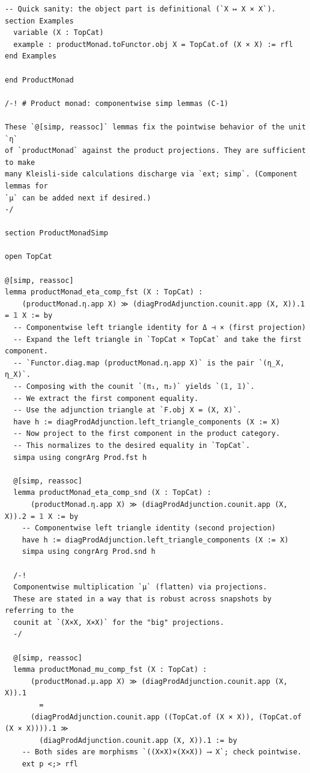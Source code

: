 \documentclass[12pt]{article}
\begin{document}
\begin{lstlisting}
-- Quick sanity: the object part is definitional (`X ↦ X × X`).
section Examples
  variable (X : TopCat)
  example : productMonad.toFunctor.obj X = TopCat.of (X × X) := rfl
end Examples

end ProductMonad

/-! # Product monad: componentwise simp lemmas (C‑1)

These `@[simp, reassoc]` lemmas fix the pointwise behavior of the unit `η`
of `productMonad` against the product projections. They are sufficient to make
many Kleisli-side calculations discharge via `ext; simp`. (Component lemmas for
`μ` can be added next if desired.)
-/

section ProductMonadSimp

open TopCat

@[simp, reassoc]
lemma productMonad_eta_comp_fst (X : TopCat) :
    (productMonad.η.app X) ≫ (diagProdAdjunction.counit.app (X, X)).1 = 𝟙 X := by
  -- Componentwise left triangle identity for Δ ⊣ × (first projection)
  -- Expand the left triangle in `TopCat × TopCat` and take the first component.
  -- `Functor.diag.map (productMonad.η.app X)` is the pair `(η_X, η_X)`.
  -- Composing with the counit `(π₁, π₂)` yields `(𝟙, 𝟙)`.
  -- We extract the first component equality.
  -- Use the adjunction triangle at `F.obj X = (X, X)`.
  have h := diagProdAdjunction.left_triangle_components (X := X)
  -- Now project to the first component in the product category.
  -- This normalizes to the desired equality in `TopCat`.
  simpa using congrArg Prod.fst h

  @[simp, reassoc]
  lemma productMonad_eta_comp_snd (X : TopCat) :
      (productMonad.η.app X) ≫ (diagProdAdjunction.counit.app (X, X)).2 = 𝟙 X := by
    -- Componentwise left triangle identity (second projection)
    have h := diagProdAdjunction.left_triangle_components (X := X)
    simpa using congrArg Prod.snd h

  /-!
  Componentwise multiplication `μ` (flatten) via projections.
  These are stated in a way that is robust across snapshots by referring to the
  counit at `(X×X, X×X)` for the "big" projections.
  -/

  @[simp, reassoc]
  lemma productMonad_mu_comp_fst (X : TopCat) :
      (productMonad.μ.app X) ≫ (diagProdAdjunction.counit.app (X, X)).1
        =
      (diagProdAdjunction.counit.app ((TopCat.of (X × X)), (TopCat.of (X × X)))).1 ≫
        (diagProdAdjunction.counit.app (X, X)).1 := by
    -- Both sides are morphisms `((X×X)×(X×X)) ⟶ X`; check pointwise.
    ext p <;> rfl


\end{lstlisting}
\end{document}
